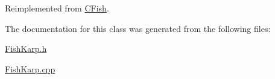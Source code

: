 Reimplemented from \mbox{\hyperlink{class_c_fish_abfc997d2d755be8f94069c57e75a854b}{C\+Fish}}.



The documentation for this class was generated from the following files\+:\begin{DoxyCompactItemize}
\item 
\mbox{\hyperlink{_fish_karp_8h}{Fish\+Karp.\+h}}\item 
\mbox{\hyperlink{_fish_karp_8cpp}{Fish\+Karp.\+cpp}}\end{DoxyCompactItemize}
